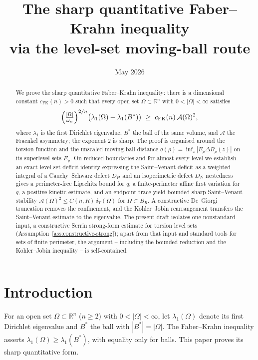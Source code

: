 \documentclass[11pt]{amsart}
\title[Sharp quantitative Faber--Krahn stability]
{The sharp quantitative Faber--Krahn inequality\\
via the level-set moving-ball route}
\author{}
\date{May 2026}
\theoremstyle{definition}
\newcommand{\R}{\mathbb R}
\newcommand{\Om}{\Omega}
\newcommand{\Fr}{\mathcal A}
\newcommand{\dT}{\delta_T}
\newcommand{\Bstar}{B^*}
\begin{document}
\begin{abstract}
We prove the sharp quantitative Faber--Krahn inequality: there is a dimensional
constant \(c_{\mathrm{FK}}(n)>0\) such that every open set \(\Om\subset\R^n\)
with \(0<|\Om|<\infty\) satisfies
\[
   \Bigl(\tfrac{|\Om|}{\omega_n}\Bigr)^{2/n}
   \bigl(\lambda_1(\Om)-\lambda_1(\Bstar)\bigr)
   \;\ge\; c_{\mathrm{FK}}(n)\,\Fr(\Om)^2 ,
\]
where \(\lambda_1\) is the first Dirichlet eigenvalue, \(\Bstar\) the ball of
the same volume, and \(\Fr\) the Fraenkel asymmetry; the exponent \(2\) is
sharp.  The proof is organised around the torsion function and the unscaled
moving-ball distance \(q(\rho)=\inf_{z}|E_\rho\Delta B_\rho(z)|\) on its
superlevel sets \(E_\rho\).  On reduced boundaries and for almost every level we
establish an exact level-set deficit identity expressing the Saint--Venant
deficit as a weighted integral of a Cauchy--Schwarz defect \(D_H\) and an
isoperimetric defect \(D_I\); nestedness gives a perimeter-free Lipschitz bound
for \(q\); a finite-perimeter affine first variation for \(q\), a positive
kinetic estimate, and an endpoint trace yield bounded sharp Saint--Venant
stability \(\Fr(\Om)^2\le C(n,R)\,\dT(\Om)\) for \(\Om\subset B_R\).  A
constructive De~Giorgi truncation removes the confinement, and the
Kohler--Jobin rearrangement transfers the Saint--Venant estimate to the
eigenvalue.  The present draft isolates one nonstandard input, a constructive
Serrin strong-form estimate for torsion level sets
(Assumption~\ref{ass:constructive-strong}); apart from that input and
standard tools for sets of finite perimeter, the argument -- including the
bounded reduction and the Kohler--Jobin inequality -- is self-contained.
\end{abstract}

\maketitle
\tableofcontents

\section{Introduction}\label{sec:intro}

For an open set \(\Om\subset\R^n\) (\(n\ge2\)) with \(0<|\Om|<\infty\), let
\(\lambda_1(\Om)\) denote its first Dirichlet eigenvalue and \(\Bstar\) the ball
with \(|\Bstar|=|\Om|\).  The Faber--Krahn inequality asserts
\(\lambda_1(\Om)\ge\lambda_1(\Bstar)\), with equality only for balls.  This
paper proves its sharp quantitative form.
\end{document}
